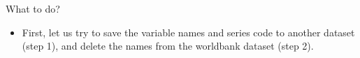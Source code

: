 \documentclass[10pt,ignorenonframetext,]{beamer}
\newenvironment{Shaded}{\begin{snugshade}}{\end{snugshade}}
\newcommand{\CommentTok}[1]{\textcolor[rgb]{0.56,0.35,0.01}{\textit{#1}}}
\newcommand{\DecValTok}[1]{\textcolor[rgb]{0.00,0.00,0.81}{#1}}
\newcommand{\KeywordTok}[1]{\textcolor[rgb]{0.13,0.29,0.53}{\textbf{#1}}}
\newcommand{\NormalTok}[1]{#1}
\newcommand{\OperatorTok}[1]{\textcolor[rgb]{0.81,0.36,0.00}{\textbf{#1}}}
\newcommand{\StringTok}[1]{\textcolor[rgb]{0.31,0.60,0.02}{#1}}
\providecommand{\tightlist}{%
  \setlength{\itemsep}{0pt}\setlength{\parskip}{0pt}}
\begin{document}
\begin{frame}[fragile]{What to do?}
\protect\hypertarget{what-to-do}{}

\begin{itemize}
\tightlist
\item
  First, let us try to save the variable names and series code to
  another dataset (step 1), and delete the names from the worldbank
  dataset (step 2).
\end{itemize}

\begin{Shaded}
\end{Shaded}

\end{frame}
\end{document}
